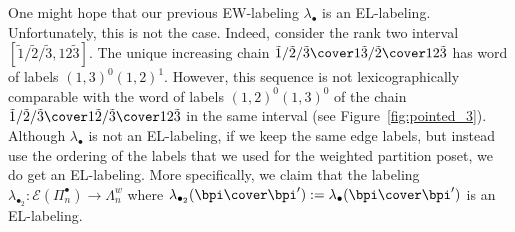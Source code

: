 One might hope that our previous EW-labeling $\lambda_\bullet$ is an EL-labeling. Unfortunately, this is not the case. Indeed,  consider the rank two interval $[ \tilde{1}/\tilde{2}/\tilde{3},12\tilde{3}]$.  The unique increasing chain $\tilde{1}/\tilde{2}/\tilde{3}\cover 1\tilde{3}/\tilde{2}\cover 12\tilde{3}$ has word of labels $(1,3)^0(1,2)^1$.  However, this sequence is not lexicographically comparable with the word of labels $(1,2)^0(1,3)^0$ of the chain $\tilde{1}/\tilde{2}/\tilde{3}\cover 1\tilde{2}/\tilde{3}\cover 12\tilde{3}$ in the same interval (see Figure~\ref{fig:pointed_3}).  Although $\lambda_\bullet$  is not an EL-labeling, if we keep the same edge labels, but instead use the ordering of the labels that we used for the weighted partition poset, we do get an EL-labeling.  More specifically, we claim that the labeling  $\lambda_{\bullet_2}: \mathcal{E}(\Pi_n^\bullet) \rightarrow \Lambda_n^w$  where $\lambda_{\bullet_2}(\bpi \cover \bpi') := \lambda_{\bullet}(\bpi \cover \bpi')$ is an EL-labeling.



